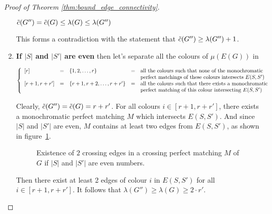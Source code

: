 \begin{proof}[Proof of Theorem \ref{thm:bound_edge_connectivity}]
\begin{enumerate}
            \begin{center}
                $\Tilde{c}(G'') = \Tilde{c}(G) \leq \lambda(G) \leq \lambda(G'')$
            \end{center}
            
            This forms a contradiction with the statement that $\Tilde{c}(G'') \geq \lambda(G'') + 1$.
            
        \item
            \textbf{If $|S|$ and $|S'|$ are even} then let's separate all the colours of $\mu\left(E(G)\right)$ in
            
            \begin{center}
                $\left\{ \begin{array}{l c l c l}
                    [r]             & = & \{1, 2, \dots, r\}              & = & \mbox{all the colours such that none of the monochromatic} \\
                                    &   &                                 &   & \mbox{perfect matchings of these colours intersects } E(S, S') \\ 
                    {[r + 1, r + r']} & = & \{r + 1, r + 2, \dots, r + r'\} & = & \mbox{all the colours such that there exists a monochromatic} \\
                                    &   &                                 &   & \mbox{perfect matching of this colour intersecting } E(S, S')
                \end{array} \right.$
            \end{center}
            
            Clearly, $\Tilde{c}(G'') = \Tilde{c}(G) = r + r'$.
            For all colours $i \in [r + 1, r + r']$, there exists a monochromatic perfect matching $M$ which intersects $E(S, S')$.
            And since $|S|$ and $|S'|$ are even, $M$ contains at least two edges from $E(S, S')$, as shown in figure~\ref{fig:proof_lambda_even}.
            
            \begin{figure}[H]
                \caption{Existence of $2$ crossing edges in a crossing perfect matching $M$ of $G$ if $|S|$ and $|S'|$ are even numbers.}
                \label{fig:proof_lambda_even}
            \end{figure}
            
            Then there exist at least 2 edges of colour $i$ in $E(S, S')$ for all $i \in [r + 1, r + r']$.
            It follows that $\lambda(G'') \geq \lambda(G) \geq 2 \cdot r'$.
            

\end{enumerate}
\end{proof}
